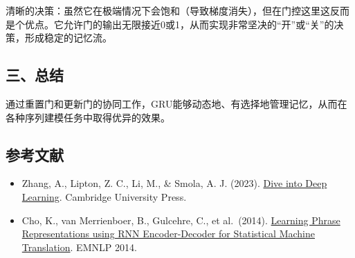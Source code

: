 清晰的决策：虽然它在极端情况下会饱和（导致梯度消失），但在门控这里这反而是个优点。它允许门的输出无限接近0或1，从而实现非常坚决的``开''或``关''的决策，形成稳定的记忆流。

\hypertarget{ux4e09ux603bux7ed3}{%
\subsection{三、总结}\label{ux4e09ux603bux7ed3}}

通过重置门和更新门的协同工作，GRU能够动态地、有选择地管理记忆，从而在各种序列建模任务中取得优异的效果。

\FloatBarrier
{}
\hypertarget{ux53c2ux8003ux6587ux732e-20}{%
\subsection{参考文献}\label{ux53c2ux8003ux6587ux732e-20}}

\vspace{0.25em}
\begin{itemize}
\tightlist
\item
  Zhang, A., Lipton, Z. C., Li, M., \& Smola, A. J. (2023). \href{https://D2L.ai}{Dive into Deep Learning}. Cambridge University Press.
\item
  Cho, K., van Merrienboer, B., Gulcehre, C., et al.~(2014). \href{https://arxiv.org/abs/1406.1078}{Learning Phrase Representations using RNN Encoder-Decoder for Statistical Machine Translation}. EMNLP 2014.
\end{itemize}

\clearpage

